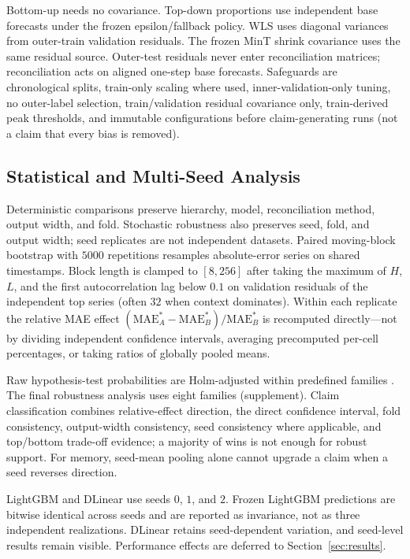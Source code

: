 \documentclass[a4paper,fleqn]{cas-dc}
\begin{document}
Bottom-up needs no covariance.
Top-down proportions use independent base forecasts under the frozen
epsilon/\allowbreak fallback policy.
{WLS} uses diagonal variances from outer-train validation residuals.
The frozen MinT shrink covariance uses the same residual source.
Outer-test residuals never enter reconciliation matrices; reconciliation acts on
aligned one-step base forecasts.
Safeguards are chronological splits, train-only scaling where used,
inner-validation-only tuning, no outer-label selection,
train/\allowbreak validation residual covariance only, train-derived peak
thresholds, and immutable configurations before claim-generating runs
(not a claim that every bias is removed).

\subsection{Statistical and Multi-Seed Analysis}
Deterministic comparisons preserve hierarchy, model, reconciliation method,
output width, and fold.
Stochastic robustness also preserves seed, fold, and output width; seed
replicates are not independent datasets.
Paired moving-block bootstrap with $5000$ repetitions resamples absolute-error
series on shared timestamps.
Block length is clamped to $[8,256]$ after taking the maximum of $H$, $L$, and
the first autocorrelation lag below $0.1$ on validation residuals of the
independent top series (often $32$ when context dominates).
Within each replicate the relative {MAE} effect
$(\mathrm{MAE}_A^\ast-\mathrm{MAE}_B^\ast)/\mathrm{MAE}_B^\ast$
is recomputed directly---not by dividing independent confidence intervals,
averaging precomputed per-cell percentages, or taking ratios of globally pooled
means.

Raw hypothesis-test probabilities are Holm-adjusted within predefined families
\cite{holm1979simple}.
The final robustness analysis uses eight families (supplement).
Claim classification combines relative-effect direction, the direct confidence
interval, fold consistency, output-width consistency, seed consistency where
applicable, and top/bottom trade-off evidence; a majority of wins is not enough
for robust support.
For memory, seed-mean pooling alone cannot upgrade a claim when a seed reverses
direction.

LightGBM and DLinear use seeds $0$, $1$, and $2$.
Frozen LightGBM predictions are bitwise identical across seeds and are reported
as invariance, not as three independent realizations.
DLinear retains seed-dependent variation, and seed-level results remain visible.
Performance effects are deferred to Section~\ref{sec:results}.
\end{document}
